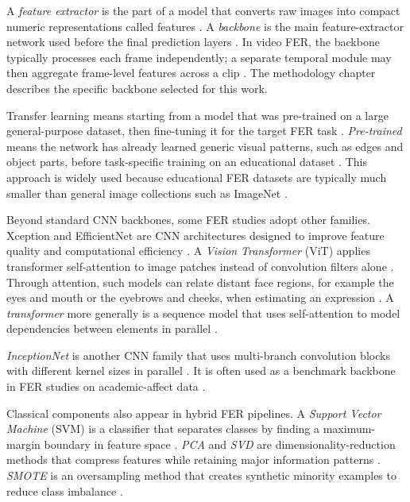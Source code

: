 A \emph{feature extractor} is the part of a model that converts raw images into compact numeric representations called features \cite{komaravalli_detecting_2023}. A \emph{backbone} is the main feature-extractor network used before the final prediction layers \cite{aly_revolutionizing_2025}. In video FER, the backbone typically processes each frame independently; a separate temporal module may then aggregate frame-level features across a clip \cite{asaju_affects_2021,asaju_adaptive_2022}. The methodology chapter describes the specific backbone selected for this work.

Transfer learning means starting from a model that was pre-trained on a large general-purpose dataset, then fine-tuning it for the target FER task \cite{komaravalli_detecting_2023}. \emph{Pre-trained} means the network has already learned generic visual patterns, such as edges and object parts, before task-specific training on an educational dataset \cite{aly_revolutionizing_2025}. This approach is widely used because educational FER datasets are typically much smaller than general image collections such as ImageNet \cite{lek_academic_2023}.

Beyond standard CNN backbones, some FER studies adopt other families. Xception and EfficientNet are CNN architectures designed to improve feature quality and computational efficiency \cite{komaravalli_detecting_2023,shiri_detection_2024}. A \emph{Vision Transformer} (ViT) applies transformer self-attention to image patches instead of convolution filters alone \cite{tulsani_realtime_2025,su_leveraging_2024}. Through attention, such models can relate distant face regions, for example the eyes and mouth or the eyebrows and cheeks, when estimating an expression \cite{su_leveraging_2024,liu_dynamic_nodate}. A \emph{transformer} more generally is a sequence model that uses self-attention to model dependencies between elements in parallel \cite{su_leveraging_2024,liu_dynamic_nodate}.

\emph{InceptionNet} is another CNN family that uses multi-branch convolution blocks with different kernel sizes in parallel \cite{gupta_daisee_2016}. It is often used as a benchmark backbone in FER studies on academic-affect data \cite{gupta_daisee_2016}.

Classical components also appear in hybrid FER pipelines. A \emph{Support Vector Machine} (SVM) is a classifier that separates classes by finding a maximum-margin boundary in feature space \cite{rao_recognition_2021,turkes_enhanced_2025}. \emph{PCA} and \emph{SVD} are dimensionality-reduction methods that compress features while retaining major information patterns \cite{santoni_convolutional_2023}. \emph{SMOTE} is an oversampling method that creates synthetic minority examples to reduce class imbalance \cite{santoni_convolutional_2023}.

